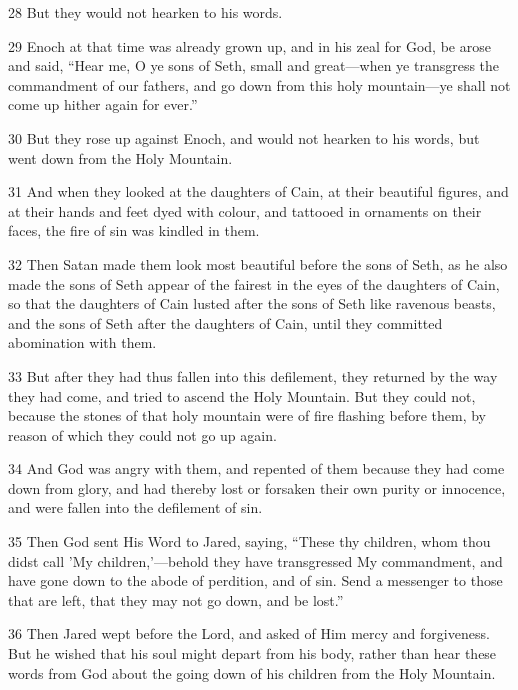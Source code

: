 \par 28 But they would not hearken to his words.

\par 29 Enoch at that time was already grown up, and in his zeal for God, be arose and said, “Hear me, O ye sons of Seth, small and great—when ye transgress the commandment of our fathers, and go down from this holy mountain—ye shall not come up hither again for ever.”

\par 30 But they rose up against Enoch, and would not hearken to his words, but went down from the Holy Mountain.

\par 31 And when they looked at the daughters of Cain, at their beautiful figures, and at their hands and feet dyed with colour, and tattooed in ornaments on their faces, the fire of sin was kindled in them.

\par 32 Then Satan made them look most beautiful before the sons of Seth, as he also made the sons of Seth appear of the fairest in the eyes of the daughters of Cain, so that the daughters of Cain lusted after the sons of Seth like ravenous beasts, and the sons of Seth after the daughters of Cain, until they committed abomination with them.

\par 33 But after they had thus fallen into this defilement, they returned by the way they had come, and tried to ascend the Holy Mountain. But they could not, because the stones of that holy mountain were of fire flashing before them, by reason of which they could not go up again.

\par 34 And God was angry with them, and repented of them because they had come down from glory, and had thereby lost or forsaken their own purity or innocence, and were fallen into the defilement of sin.

\par 35 Then God sent His Word to Jared, saying, “These thy children, whom thou didst call 'My children,'—behold they have transgressed My commandment, and have gone down to the abode of perdition, and of sin. Send a messenger to those that are left, that they may not go down, and be lost.”

\par 36 Then Jared wept before the Lord, and asked of Him mercy and forgiveness. But he wished that his soul might depart from his body, rather than hear these words from God about the going down of his children from the Holy Mountain.

